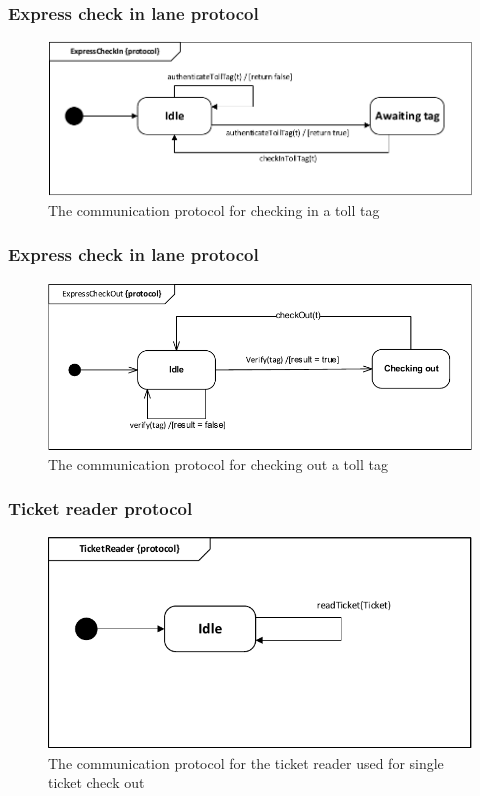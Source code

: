 \subsubsection*{Express check in lane protocol}
\begin{figure}[H]
\centering
\includegraphics[width=0.7\linewidth]{img/behaviour_state_machines/protocol_state_machines/protocol_state_machine_station_server_to_express_lane_check_in}
\caption{The communication protocol for checking in a toll tag}
\label{fig:protocol_state_machine_station_server with_toll_computer_check_in}
\end{figure}

\subsubsection*{Express check in lane protocol}
\begin{figure}[H]
\centering
\includegraphics[width=0.7\linewidth]{img/behaviour_state_machines/protocol_state_machines/protocol_state_machine_station_server_to_express_lane_check_out}
\caption{The communication protocol for checking out a toll tag}
\label{fig:protocol_state_machine_station_server with_toll_computer_check_out}
\end{figure}

\subsubsection*{Ticket reader protocol}
\begin{figure}[H]
\centering
\includegraphics[width=0.7\linewidth]{img/behaviour_state_machines/protocol_state_machines/protocol_state_machine_ticket_reader}
\caption{The communication protocol for the ticket reader used for single ticket check out}
\label{fig:protocol_state_machine_ticket_reader}
\end{figure}

